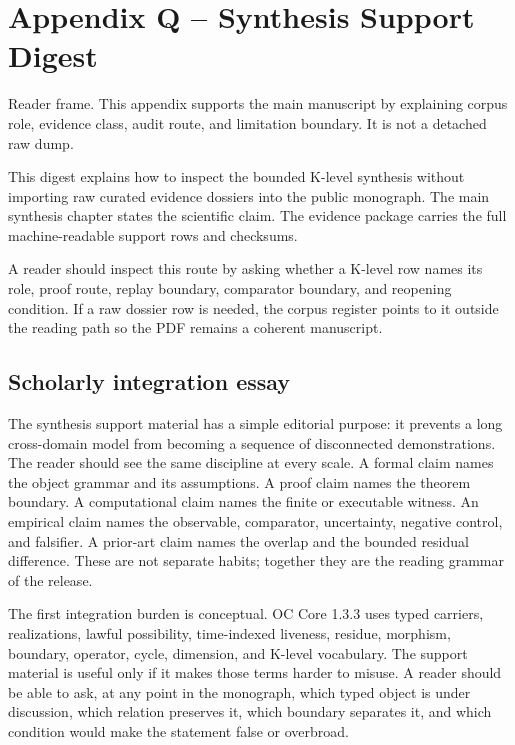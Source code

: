\section{Appendix Q -- Synthesis Support Digest}
Reader frame. This appendix supports the main manuscript by explaining corpus role, evidence class, audit route, and limitation boundary. It is not a detached raw dump.


\label{sec:oc-core-1-3-synthesis-support-dossiers}

This digest explains how to inspect the bounded K-level synthesis without importing raw curated evidence dossiers into the public monograph. The main synthesis chapter states the scientific claim. The evidence package carries the full machine-readable support rows and checksums.


A reader should inspect this route by asking whether a K-level row names its role, proof route, replay boundary, comparator boundary, and reopening condition. If a raw dossier row is needed, the corpus register points to it outside the reading path so the PDF remains a coherent manuscript.


\subsection{Scholarly integration essay}

The synthesis support material has a simple editorial purpose: it prevents a long cross-domain model from becoming a sequence of disconnected demonstrations. The reader should see the same discipline at every scale. A formal claim names the object grammar and its assumptions. A proof claim names the theorem boundary. A computational claim names the finite or executable witness. An empirical claim names the observable, comparator, uncertainty, negative control, and falsifier. A prior-art claim names the overlap and the bounded residual difference. These are not separate habits; together they are the reading grammar of the release.


The first integration burden is conceptual. OC Core 1.3.3 uses typed carriers, realizations, lawful possibility, time-indexed liveness, residue, morphism, boundary, operator, cycle, dimension, and K-level vocabulary. The support material is useful only if it makes those terms harder to misuse. A reader should be able to ask, at any point in the monograph, which typed object is under discussion, which relation preserves it, which boundary separates it, and which condition would make the statement false or overbroad.


